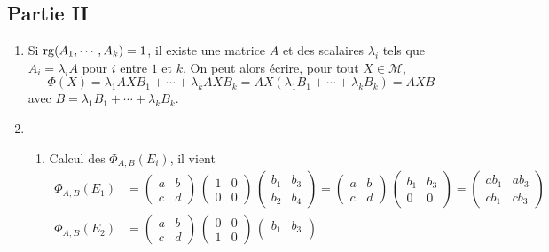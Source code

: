 \subsection*{Partie II}
\begin{enumerate}
\item Si $\operatorname{rg}(A_1,\cdots,A_k)=1$, il existe une matrice $A$ et des scalaires $\lambda_i$ tels que $A_i=\lambda_i A$ pour $i$ entre $1$ et $k$. On peut alors écrire, pour tout $X\in \mathcal{M}$,
\begin{displaymath}
 \Phi(X)=\lambda_1AXB_1+\cdots + \lambda_kAXB_k
=AX\left(\lambda_1B_1+\cdots +\lambda_kB_k\right) =AXB 
\end{displaymath}
avec $B=\lambda_1B_1+\cdots +\lambda_kB_k$.
\item 
\begin{enumerate}
\item Calcul des  $\Phi_{A,B} (E_{i})$, il vient 
\begin{align*}
\Phi_{A,B} (E_{1}) &= 
\begin{pmatrix}
a & b \\ 
c & d
\end{pmatrix}
 \,  
\begin{pmatrix}
1 & 0 \\ 
0 & 0
\end{pmatrix}
 \,  
\begin{pmatrix}
b_{1} & b_{3} \\ 
b_{2} & b_{4}
\end{pmatrix}
 = 
\begin{pmatrix}
a & b \\ 
c & d
\end{pmatrix}
 \,  
\begin{pmatrix}
b_{1} & b_{3} \\ 
0 & 0
\end{pmatrix}
 = 
\begin{pmatrix}
ab_{1} & ab_{3} \\ 
cb_{1} & cb_{3}
\end{pmatrix}
  \\
\Phi_{A,B} (E_{2}) &=
\begin{pmatrix}
a & b \\ 
c & d
\end{pmatrix}
 \,  
\begin{pmatrix}
0 & 0 \\ 
1 & 0
\end{pmatrix}
 \,  
\begin{pmatrix}
b_{1} & b_{3} \\ 

\end{pmatrix}
\end{align*}
\end{enumerate}
\end{enumerate}
